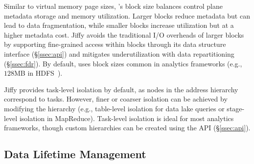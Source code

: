  Similar to virtual memory page sizes, \jiffy's block size balances control plane metadata storage and memory utilization. Larger blocks reduce metadata but can lead to data fragmentation, while smaller blocks increase utilization but at a higher metadata cost. Jiffy avoids the traditional I/O overheads of larger blocks by supporting fine-grained access within blocks through its data structure interface (\S\ref{ssec:api}) and mitigates underutilization with data repartitioning (\S\ref{ssec:fdr}). By default, \jiffy uses block sizes common in analytics frameworks (e.g., $128$MB in HDFS~\cite{hdfs}).

 Jiffy provides task-level isolation by default, as nodes in the address hierarchy correspond to tasks. However, finer or coarser isolation can be achieved by modifying the hierarchy (e.g., table-level isolation for data lake queries or stage-level isolation in MapReduce). Task-level isolation is ideal for most analytics frameworks, though custom hierarchies can be created using the \jiffy API (\S\ref{ssec:api}).

\subsection{Data Lifetime Management}
\label{ssec:mlm}


